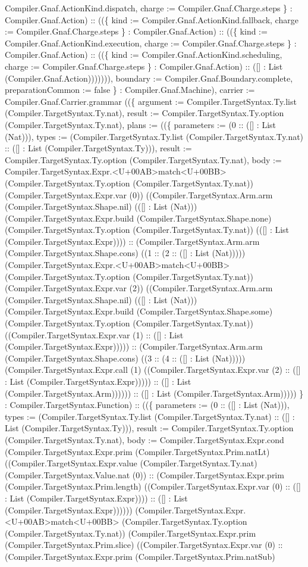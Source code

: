 \documentclass[11pt]{article}
\begin{document}
Compiler.Gnaf.ActionKind.dispatch, charge := Compiler.Gnaf.Charge.steps \} : Compiler.Gnaf.Action) :: ((\{ kind := Compiler.Gnaf.ActionKind.fallback, charge := Compiler.Gnaf.Charge.steps \} : Compiler.Gnaf.Action) :: ((\{ kind := Compiler.Gnaf.ActionKind.execution, charge := Compiler.Gnaf.Charge.steps \} : Compiler.Gnaf.Action) :: ((\{ kind := Compiler.Gnaf.ActionKind.scheduling, charge := Compiler.Gnaf.Charge.steps \} : Compiler.Gnaf.Action) :: ([] : List (Compiler.Gnaf.Action))))))), boundary := Compiler.Gnaf.Boundary.complete, preparationCommon := false \} : Compiler.Gnaf.Machine), carrier := Compiler.Gnaf.Carrier.grammar ((\{ argument := Compiler.TargetSyntax.Ty.list (Compiler.TargetSyntax.Ty.nat), result := Compiler.TargetSyntax.Ty.option (Compiler.TargetSyntax.Ty.nat), plans := ((\{ parameters := (0 :: ([] : List (Nat))), types := (Compiler.TargetSyntax.Ty.list (Compiler.TargetSyntax.Ty.nat) :: ([] : List (Compiler.TargetSyntax.Ty))), result := Compiler.TargetSyntax.Ty.option (Compiler.TargetSyntax.Ty.nat), body := Compiler.TargetSyntax.Expr.<U+00AB>match<U+00BB> (Compiler.TargetSyntax.Ty.option (Compiler.TargetSyntax.Ty.nat)) (Compiler.TargetSyntax.Expr.var (0)) ((Compiler.TargetSyntax.Arm.arm (Compiler.TargetSyntax.Shape.nil) (([] : List (Nat))) (Compiler.TargetSyntax.Expr.build (Compiler.TargetSyntax.Shape.none) (Compiler.TargetSyntax.Ty.option (Compiler.TargetSyntax.Ty.nat)) (([] : List (Compiler.TargetSyntax.Expr)))) :: (Compiler.TargetSyntax.Arm.arm (Compiler.TargetSyntax.Shape.cons) ((1 :: (2 :: ([] : List (Nat))))) (Compiler.TargetSyntax.Expr.<U+00AB>match<U+00BB> (Compiler.TargetSyntax.Ty.option (Compiler.TargetSyntax.Ty.nat)) (Compiler.TargetSyntax.Expr.var (2)) ((Compiler.TargetSyntax.Arm.arm (Compiler.TargetSyntax.Shape.nil) (([] : List (Nat))) (Compiler.TargetSyntax.Expr.build (Compiler.TargetSyntax.Shape.some) (Compiler.TargetSyntax.Ty.option (Compiler.TargetSyntax.Ty.nat)) ((Compiler.TargetSyntax.Expr.var (1) :: ([] : List (Compiler.TargetSyntax.Expr))))) :: (Compiler.TargetSyntax.Arm.arm (Compiler.TargetSyntax.Shape.cons) ((3 :: (4 :: ([] : List (Nat))))) (Compiler.TargetSyntax.Expr.call (1) ((Compiler.TargetSyntax.Expr.var (2) :: ([] : List (Compiler.TargetSyntax.Expr))))) :: ([] : List (Compiler.TargetSyntax.Arm)))))) :: ([] : List (Compiler.TargetSyntax.Arm))))) \} : Compiler.TargetSyntax.Function) :: ((\{ parameters := (0 :: ([] : List (Nat))), types := (Compiler.TargetSyntax.Ty.list (Compiler.TargetSyntax.Ty.nat) :: ([] : List (Compiler.TargetSyntax.Ty))), result := Compiler.TargetSyntax.Ty.option (Compiler.TargetSyntax.Ty.nat), body := Compiler.TargetSyntax.Expr.cond (Compiler.TargetSyntax.Expr.prim (Compiler.TargetSyntax.Prim.natLt) ((Compiler.TargetSyntax.Expr.value (Compiler.TargetSyntax.Ty.nat) (Compiler.TargetSyntax.Value.nat (0)) :: (Compiler.TargetSyntax.Expr.prim (Compiler.TargetSyntax.Prim.length) ((Compiler.TargetSyntax.Expr.var (0) :: ([] : List (Compiler.TargetSyntax.Expr)))) :: ([] : List (Compiler.TargetSyntax.Expr)))))) (Compiler.TargetSyntax.Expr.<U+00AB>match<U+00BB> (Compiler.TargetSyntax.Ty.option (Compiler.TargetSyntax.Ty.nat)) (Compiler.TargetSyntax.Expr.prim (Compiler.TargetSyntax.Prim.slice) ((Compiler.TargetSyntax.Expr.var (0) :: (Compiler.TargetSyntax.Expr.prim (Compiler.TargetSyntax.Prim.natSub) 
\end{document}
